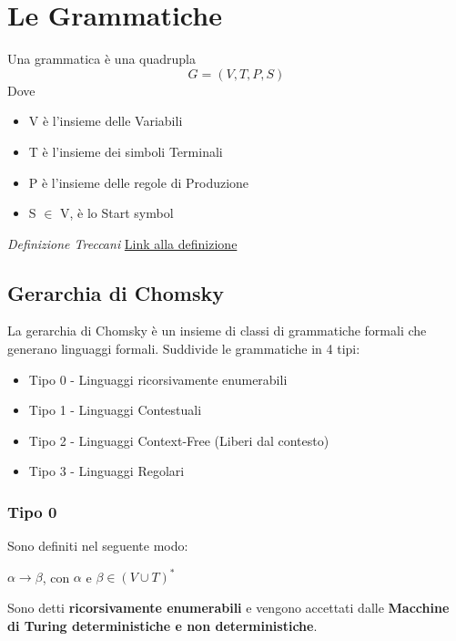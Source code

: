 \chapter{Le Grammatiche}
Una grammatica è una quadrupla
\begin{equation*}
    G=(V, T, P,S)
\end{equation*}
Dove
\begin{itemize}
    \item V è l'insieme delle Variabili
    \item T è l'insieme dei simboli Terminali
    \item P è l'insieme delle regole di Produzione
    \item S $\in$ V, è lo Start symbol
\end{itemize}
\textit{Definizione Treccani} \href{https://www.treccani.it/enciclopedia/grammatica_%28Enciclopedia-della-Matematica%29/}{Link alla definizione}
\section{Gerarchia di Chomsky}
La gerarchia di Chomsky è un insieme di classi di grammatiche formali che generano linguaggi formali.
Suddivide le grammatiche in 4 tipi:
\begin{itemize}
    \item Tipo 0 - Linguaggi ricorsivamente enumerabili
    \item Tipo 1 - Linguaggi Contestuali
    \item Tipo 2 - Linguaggi Context-Free (Liberi dal contesto)
    \item Tipo 3 - Linguaggi Regolari
\end{itemize}
\subsection{Tipo 0}
Sono definiti nel seguente modo:
\begin{center}
    $\alpha \rightarrow \beta$, con $\alpha$ e $\beta \in (V \cup T)^*$
\end{center}
Sono detti \textbf{ricorsivamente enumerabili} e vengono accettati dalle 
\textbf{Macchine di Turing deterministiche e non deterministiche}.
